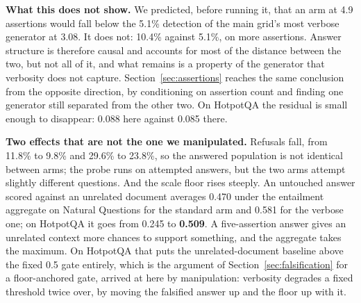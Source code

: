\documentclass[11pt]{article}
\begin{document}
\textbf{What this does not show.} We predicted, before running it, that an arm at 4.9 assertions would fall below the 5.1\% detection of the main grid's most verbose generator at 3.08. It does not: 10.4\% against 5.1\%, on more assertions. Answer structure is therefore causal and accounts for most of the distance between the two, but not all of it, and what remains is a property of the generator that verbosity does not capture. Section~\ref{sec:assertions} reaches the same conclusion from the opposite direction, by conditioning on assertion count and finding one generator still separated from the other two. On HotpotQA the residual is small enough to disappear: 0.088 here against 0.085 there.

\textbf{Two effects that are not the one we manipulated.} Refusals fall, from 11.8\% to 9.8\% and 29.6\% to 23.8\%, so the answered population is not identical between arms; the probe runs on attempted answers, but the two arms attempt slightly different questions. And the scale floor rises steeply. An untouched answer scored against an unrelated document averages 0.470 under the entailment aggregate on Natural Questions for the standard arm and 0.581 for the verbose one; on HotpotQA it goes from 0.245 to \textbf{0.509}. A five-assertion answer gives an unrelated context more chances to support something, and the aggregate takes the maximum. On HotpotQA that puts the unrelated-document baseline above the fixed 0.5 gate entirely, which is the argument of Section~\ref{sec:falsification} for a floor-anchored gate, arrived at here by manipulation: verbosity degrades a fixed threshold twice over, by moving the falsified answer up and the floor up with it.
\end{document}

